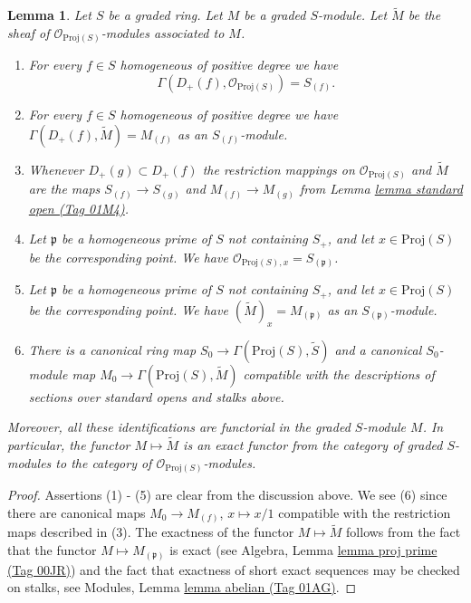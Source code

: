 \documentclass{amsart}
\theoremstyle{plain}
\newtheorem{lemma}[subsection]{Lemma}
\theoremstyle{definition}
\theoremstyle{remark}
\numberwithin{equation}{subsection}
\begin{document}
\begin{lemma}
\label{constructions-lemma-proj-sheaves}
Let $S$ be a graded ring. Let $M$ be a graded $S$-module.
Let $\widetilde M$ be the sheaf of $\mathcal{O}_{\text{Proj}(S)}$-modules
associated to $M$.
\begin{enumerate}
\item For every $f \in S$ homogeneous of positive degree we have
$$
\Gamma(D_{+}(f), \mathcal{O}_{\text{Proj}(S)}) = S_{(f)}.
$$
\item For every $f\in S$ homogeneous of positive degree
we have $\Gamma(D_{+}(f), \widetilde M) = M_{(f)}$
as an $S_{(f)}$-module.
\item Whenever $D_{+}(g) \subset D_{+}(f)$ the restriction mappings
on $\mathcal{O}_{\text{Proj}(S)}$ and $\widetilde M$
are the maps
$S_{(f)} \to S_{(g)}$ and $M_{(f)} \to M_{(g)}$ from Lemma
\href{https://stacks.math.columbia.edu/tag/01M4}{lemma standard open (Tag 01M4)}.
\item Let $\mathfrak p$ be a homogeneous prime of $S$ not containing
$S_{+}$, and let $x \in \text{Proj}(S)$
be the corresponding point. We have
$\mathcal{O}_{\text{Proj}(S), x} = S_{(\mathfrak p)}$.
\item Let $\mathfrak p$ be a homogeneous prime of $S$ not containing
$S_{+}$, and let $x \in \text{Proj}(S)$
be the corresponding point. We have $(\widetilde M)_x = M_{(\mathfrak p)}$
as an $S_{(\mathfrak p)}$-module.
\item
\label{constructions-item-map}
There is a canonical ring map
$
S_0 \longrightarrow \Gamma(\text{Proj}(S), \widetilde S)
$
and a canonical $S_0$-module map
$
M_0 \longrightarrow \Gamma(\text{Proj}(S), \widetilde M)
$
compatible with the descriptions of sections over standard opens
and stalks above.
\end{enumerate}
Moreover, all these identifications are functorial in the graded
$S$-module $M$. In particular, the functor $M \mapsto \widetilde M$
is an exact functor from the category of graded $S$-modules
to the category of $\mathcal{O}_{\text{Proj}(S)}$-modules.
\end{lemma}

\begin{proof}
Assertions (1) - (5) are clear from the discussion above.
We see (6) since there are canonical maps $M_0 \to M_{(f)}$,
$x \mapsto x/1$ compatible with the restriction maps
described in (3). The exactness of the functor $M \mapsto \widetilde M$
follows from the fact that the functor $M \mapsto M_{(\mathfrak p)}$
is exact (see Algebra, Lemma \href{https://stacks.math.columbia.edu/tag/00JR}{lemma proj prime (Tag 00JR)})
and the fact that exactness of short exact sequences
may be checked on stalks, see
Modules, Lemma \href{https://stacks.math.columbia.edu/tag/01AG}{lemma abelian (Tag 01AG)}.
\end{proof}
\end{document}
